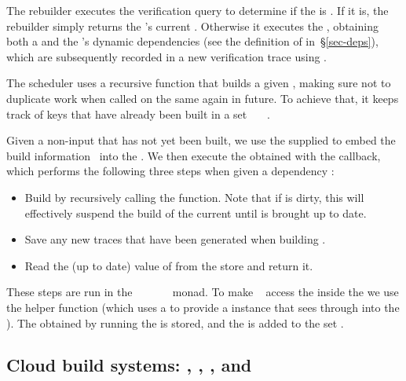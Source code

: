 The rebuilder executes the verification query  to determine if the
 is . If it is, the rebuilder simply returns the 's
current . Otherwise it executes the , obtaining both a
 and the 's dynamic dependencies  (see the
definition of  in~\S\ref{sec-deps}), which are subsequently recorded
in a new verification trace using .

The  scheduler uses a recursive function  that builds
a given , making sure not to duplicate work when called on the same
 again in future. To achieve that, it keeps track of keys that have
already been built in a set ~\hs{::}~~.

Given a non-input  that has not yet been built, we use the supplied
 to embed the build information~ into the .
We then execute the obtained  with the  callback, which
performs the following three steps when given a dependency :

\begin{itemize}
    \item Build  by recursively calling the  function. Note
          that if  is dirty, this will effectively suspend the build of
          the current  until  is brought up to date.
    \item Save any new traces that have been generated when building .
    \item Read the (up to date) value of  from the store and return it.
\end{itemize}

These steps are run in the
~~~~~~
monad. To make ~ access the  inside the 
we use the helper function  (which uses a  to provide a 
instance that sees through into the ).
The  obtained by running the  is
stored, and the  is added to the set .

\subsection{Cloud build systems: \Bazel, \CloudBuild, \Cloud \Shake, \Buck and \Nix}\label{sec-implementation-cloud}

